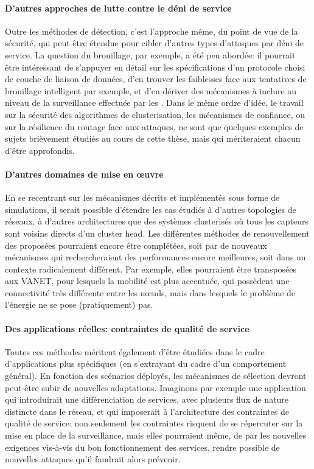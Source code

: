     \paragraph{D'autres approches de lutte contre le déni de service}
Outre les méthodes de détection, c'est l'approche même, du point de vue de la sécurité, qui peut être étendue pour cibler d'autres types d'attaques par déni de service.
La question du brouillage, par exemple, a été peu abordée: il pourrait être intéressant de s'appuyer en détail sur les spécifications d'un protocole choisi de couche de liaison de données, d'en trouver les faiblesses face aux tentatives de brouillage intelligent par exemple, et d'en dériver des mécanismes à inclure au niveau de la surveillance effectuée par les \cnst.
Dans le même ordre d'idée, le travail sur la sécurité des algorithmes de clusterisation, les mécanismes de confiance, ou sur la résilience du routage face aux attaques, ne sont que quelques exemples de sujets brièvement étudiés au cours de cette thèse, mais qui mériteraient chacun d'être approfondis.

    \paragraph{D'autres domaines de mise en œuvre}
En se recentrant sur les mécanismes décrits et implémentés sous forme de simulations, il serait possible d'étendre les cas étudiés à d'autres topologies de réseaux, à d'autres architectures que des systèmes clusterisés où tous les capteurs sont voisins directs d'un cluster head.
Les différentes méthodes de renouvellement des \cnst proposées pourraient encore être complétées, soit par de nouveaux mécanismes qui rechercheraient des performances encore meilleures, soit dans un contexte radicalement différent.
Par exemple, elles pourraient être transposées aux VANET, pour lesquels la mobilité est plus accentuée, qui possèdent une connectivité très différente entre les nœuds, mais dans lesquels le problème de l'énergie ne se pose (pratiquement) pas.

\pagebreak %
    \paragraph{Des applications réelles: contraintes de qualité de service}
Toutes ces méthodes méritent également d'être étudiées dans le cadre d'applications plus spécifiques (en s'extrayant du cadre d'un comportement général).
En fonction des scénarios déployés, les mécanismes de sélection devront peut-être subir de nouvelles adaptations.
Imaginons par exemple une application qui introduirait une différenciation de services, avec plusieurs flux de nature distincte dans le réseau, et qui imposerait à l'architecture des contraintes de qualité de service: non seulement les contraintes risquent de se répercuter sur la mise en place de la surveillance, mais elles pourraient même, de par les nouvelles exigences vis-à-vis du bon fonctionnement des services, rendre possible de nouvelles attaques qu'il faudrait alors prévenir.

